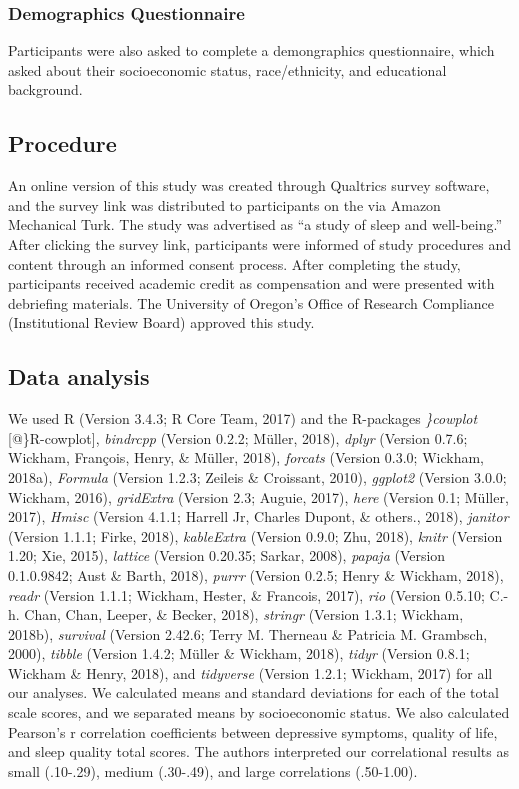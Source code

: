 \documentclass[man, noextraspace]{apa6}
\theoremstyle{definition}
\theoremstyle{definition}
\theoremstyle{definition}
\theoremstyle{remark}
\begin{document}
\subsubsection{Demographics
Questionnaire}\label{demographics-questionnaire}

Participants were also asked to complete a demongraphics questionnaire,
which asked about their socioeconomic status, race/ethnicity, and
educational background.

\subsection{Procedure}\label{procedure}

An online version of this study was created through Qualtrics survey
software, and the survey link was distributed to participants on the via
Amazon Mechanical Turk. The study was advertised as \enquote{a study of
sleep and well-being.} After clicking the survey link, participants were
informed of study procedures and content through an informed consent
process. After completing the study, participants received academic
credit as compensation and were presented with debriefing materials. The
University of Oregon's Office of Research Compliance (Institutional
Review Board) approved this study.

\subsection{Data analysis}\label{data-analysis}

We used R (Version 3.4.3; R Core Team, 2017) and the R-packages
\emph{\}cowplot} {[}@\}R-cowplot{]}, \emph{bindrcpp} (Version 0.2.2;
Müller, 2018), \emph{dplyr} (Version 0.7.6; Wickham, François, Henry, \&
Müller, 2018), \emph{forcats} (Version 0.3.0; Wickham, 2018a),
\emph{Formula} (Version 1.2.3; Zeileis \& Croissant, 2010),
\emph{ggplot2} (Version 3.0.0; Wickham, 2016), \emph{gridExtra} (Version
2.3; Auguie, 2017), \emph{here} (Version 0.1; Müller, 2017),
\emph{Hmisc} (Version 4.1.1; Harrell Jr, Charles Dupont, \& others.,
2018), \emph{janitor} (Version 1.1.1; Firke, 2018), \emph{kableExtra}
(Version 0.9.0; Zhu, 2018), \emph{knitr} (Version 1.20; Xie, 2015),
\emph{lattice} (Version 0.20.35; Sarkar, 2008), \emph{papaja} (Version
0.1.0.9842; Aust \& Barth, 2018), \emph{purrr} (Version 0.2.5; Henry \&
Wickham, 2018), \emph{readr} (Version 1.1.1; Wickham, Hester, \&
Francois, 2017), \emph{rio} (Version 0.5.10; C.-h. Chan, Chan, Leeper,
\& Becker, 2018), \emph{stringr} (Version 1.3.1; Wickham, 2018b),
\emph{survival} (Version 2.42.6; Terry M. Therneau \& Patricia M.
Grambsch, 2000), \emph{tibble} (Version 1.4.2; Müller \& Wickham, 2018),
\emph{tidyr} (Version 0.8.1; Wickham \& Henry, 2018), and
\emph{tidyverse} (Version 1.2.1; Wickham, 2017) for all our analyses. We
calculated means and standard deviations for each of the total scale
scores, and we separated means by socioeconomic status. We also
calculated Pearson's r correlation coefficients between depressive
symptoms, quality of life, and sleep quality total scores. The authors
interpreted our correlational results as small (.10-.29), medium
(.30-.49), and large correlations (.50-1.00).
\end{document}
